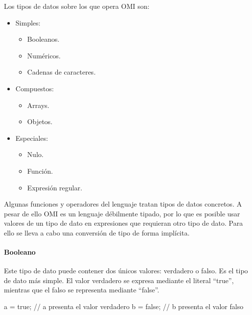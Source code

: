 Los tipos de datos sobre los que opera OMI son:
\begin{itemize}
\item Simples:
\begin{itemize}
   \item Booleanos.
   \item Numéricos.
   \item Cadenas de caracteres.
\end{itemize}
\item Compuestos:
\begin{itemize}
   \item Arrays.
   \item Objetos.
\end{itemize}
\item Especiales:
\begin {itemize}
   \item Nulo.
   \item Función.
   \item Expresión regular.
\end{itemize}
\end{itemize}

Algunas funciones y operadores del lenguaje tratan tipos de datos concretos. A pesar de ello OMI es un lenguaje débilmente tipado, por
lo que es posible usar valores de un tipo de dato en expresiones que requieran otro tipo de dato. Para ello se lleva a cabo una conversión de
tipo de forma implícita.

\paragraph{Booleano}\label{sec:type_bool}
Este tipo de dato puede contener dos únicos valores: verdadero o falso. Es el tipo de dato 
más simple. El valor verdadero se expresa mediante el literal ``true'', mientras que el 
falso se representa mediante ``false''. \\

\begin{myverbatim}
   a = true; // a presenta el valor verdadero
   b = false; // b presenta el valor falso
\end{myverbatim}



